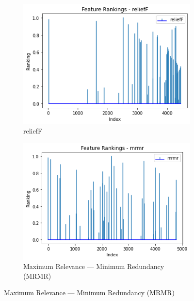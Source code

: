 \documentclass[runningheads]{llncs}
\begin{document}
\begin{figure}[htb]
  \centering
  \begin{subfigure}[b]{\linewidth}
    \includegraphics[width=1\linewidth]{part_rankings_k-50_reliefF.png}
    \caption{reliefF}
    \label{fig:part-rankings-reliefF}
  \end{subfigure}

  \begin{subfigure}[b]{\linewidth}
    \includegraphics[width=1\linewidth]{part_rankings_k-50_mrmr.png}
    \caption{Maximum Relevance — Minimum Redundancy (MRMR)}
    \label{fig:part-rankings-mrmr}
  \end{subfigure}


\end{figure}
\end{document}
